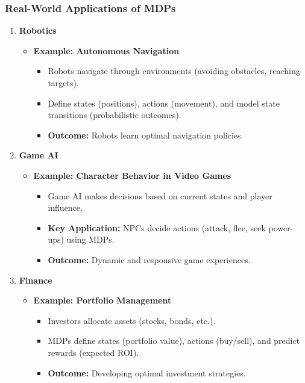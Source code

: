 \documentclass[aspectratio=169]{beamer}
\begin{document}
\begin{frame}[fragile]
    \frametitle{Real-World Applications of MDPs}
    \begin{enumerate}
        \item \textbf{Robotics}
        \begin{itemize}
            \item \textbf{Example: Autonomous Navigation}
            \begin{itemize}
                \item Robots navigate through environments (avoiding obstacles, reaching targets).
                \item Define states (positions), actions (movement), and model state transitions (probabilistic outcomes).
                \item \textbf{Outcome:} Robots learn optimal navigation policies.
            \end{itemize}
        \end{itemize}
        
        \item \textbf{Game AI}
        \begin{itemize}
            \item \textbf{Example: Character Behavior in Video Games}
                \begin{itemize}
                    \item Game AI makes decisions based on current states and player influence.
                    \item \textbf{Key Application:} NPCs decide actions (attack, flee, seek power-ups) using MDPs.
                    \item \textbf{Outcome:} Dynamic and responsive game experiences.
                \end{itemize}
        \end{itemize}
        
        \item \textbf{Finance}
        \begin{itemize}
            \item \textbf{Example: Portfolio Management}
            \begin{itemize}
                \item Investors allocate assets (stocks, bonds, etc.).
                \item MDPs define states (portfolio value), actions (buy/sell), and predict rewards (expected ROI).
                \item \textbf{Outcome:} Developing optimal investment strategies.
            \end{itemize}
        \end{itemize}
    \end{enumerate}
\end{frame}
\end{document}
